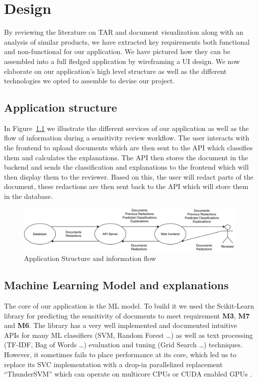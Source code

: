\documentclass[\version]{l4proj}
\begin{document}
\chapter{Design}

By reviewing the literature on TAR and document visualization along with an analysis of similar products, we have extracted key requirements both functional and non-functional for our application.
We have pictured how they can be assembled into a full fledged application by wireframing a UI design.
We now elaborate on our application's high level structure as well as the different technologies we opted to assemble to devise our project.

\section{Application structure}

In Figure~\ref{fig:design_diagram} we illustrate the different services of our application as well as the flow of information during a sensitivity review workflow.
The user interacts with the frontend to upload documents which are then sent to the API which classifies them and calculates the explanations.
The API then stores the document in the backend and sends the classification and explanations to the frontend which will then display them to the reviewer.
Based on this, the user will redact parts of the document, these redactions are then sent back to the API which will store them in the database.

\begin{figure}[H]
    \centering
    \includegraphics[width=\textwidth]{figures/design_diagram.pdf}
    \caption{Application Structure and information flow}\label{fig:design_diagram}
\end{figure}

\section{Machine Learning Model and explanations}

The core of our application is the ML model.
To build it we used the Scikit-Learn library \autocite{pedregosaScikitlearnMachineLearning2011} for predicting the sensitivity of documents to meet requirement \textbf{M3}, \textbf{M7} and \textbf{M6}.
The library has a very well implemented and documented intuitive APIs for many ML classifiers (SVM, Random Forest \ldots) as well as text processing (TF-IDF, Bag of Words \ldots) evaluation and tuning (Grid Search \ldots) techniques.
However, it sometimes fails to place performance at its core, which led us to replace its SVC implementation with a drop-in parallelized replacement ``ThunderSVM'' which can operate on multicore CPUs or CUDA enabled GPUs \autocite{wenThunderSVMFastSVM2018}.
\end{document}
